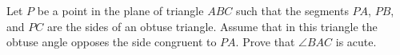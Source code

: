 Let $P$ be a point in the plane of triangle $ABC$ such that the segments $PA$,  $PB$,  and $PC$ are the sides of an obtuse triangle. Assume that in this triangle the obtuse angle opposes the side congruent to $PA$. Prove that $\angle BAC$ is acute.